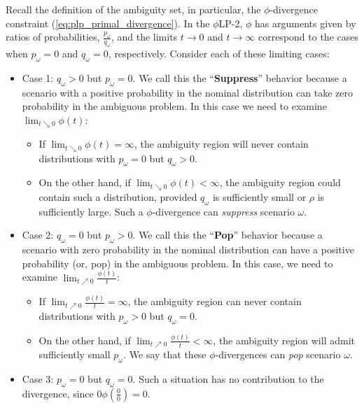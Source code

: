 \documentclass[ijoc,letterpaper]{informs3} %
\newcommand{\plp}{$\phi$LP-2}
\begin{document}
Recall the definition of the ambiguity set, in particular, the $\phi$-divergence constraint (\ref{eq:plp_primal_divergence}). 
In the \plp, $\phi$ has arguments given by ratios of probabilities, $\tfrac{p_\omega}{q_\omega}$, and the limits $t \rightarrow 0$ and $t \rightarrow \infty$ correspond to the cases when $p_\omega = 0$ and $q_\omega = 0$, respectively.
Consider each of these limiting cases:
\begin{itemize}
	\item {\sc Case 1:} $q_\omega > 0$ but $p_\omega = 0$.
		We call this the ``{\bf Suppress}'' behavior because a scenario with a positive probability in the nominal distribution can take zero probability in the ambiguous problem. In this case we need to examine $\lim_{t \searrow 0} \phi(t)$:
	\begin{itemize}
		\item If $\lim_{t \searrow 0} \phi(t) = \infty$, the ambiguity region will never contain distributions with $p_\omega = 0$ but $q_\omega > 0$.
		\item On the other hand, if $\lim_{t \searrow 0} \phi(t) < \infty$, the ambiguity region could contain such a distribution, provided $q_\omega$ is sufficiently small or $\rho$ is sufficiently large.
			Such a $\phi$-divergence can \emph{suppress} scenario $\omega$.
	\end{itemize}
	\item {\sc Case 2:} $q_\omega = 0$ but $p_\omega > 0$.
		We call this the ``{\bf Pop}'' behavior because a scenario with zero probability in the nominal distribution can have a positive probability (or, pop) in the ambiguous problem. In this case, we need to examine $\lim_{t \nearrow 0} \frac{\phi(t)}{t}$:
	\begin{itemize}
		\item If $\lim_{t \nearrow 0} \frac{\phi(t)}{t} = \infty$, the ambiguity region can never contain distributions with $p_\omega > 0$ but $q_\omega = 0$.
		\item On the other hand, if $\lim_{t \nearrow 0} \frac{\phi(t)}{t} < \infty$, the ambiguity region will admit sufficiently small $p_\omega$.
			We say that these $\phi$-divergences can \emph{pop} scenario $\omega$.
	\end{itemize}
	\item {\sc Case 3:} $p_\omega = 0$ but $q_\omega = 0$.
		Such a situation has no contribution to the divergence, since $0 \phi\left(\tfrac{0}{0}\right) = 0$.
\end{itemize}
\end{document}
